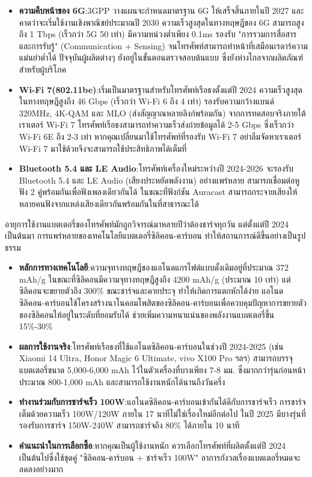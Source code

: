 \begin{itemize}
  \item \textbf{ความคืบหน้าของ 6G}:3GPP วางแผนจะกำหนดมาตรฐาน 6G ให้เสร็จสิ้นภายในปี 2027 และคาดว่าจะเริ่มใช้งานเชิงพาณิชย์ประมาณปี 2030 ความเร็วสูงสุดในทางทฤษฎีของ 6G สามารถสูงถึง 1 Tbps (เร็วกว่า 5G 50 เท่า) มีความหน่วงต่ำเพียง 0.1ms รองรับ "การรวมการสื่อสารและการรับรู้" (Communication + Sensing) จนโทรศัพท์สามารถทำหน้าที่เสมือนเรดาร์ความแม่นยำต่ำได้ ปัจจุบันผู้ผลิตต่างๆ ยังอยู่ในขั้นตอนตรวจสอบต้นแบบ ซึ่งยังห่างไกลจากผลิตภัณฑ์สำหรับผู้บริโภค
  \item \textbf{Wi-Fi 7(802.11be)}:เริ่มเป็นมาตรฐานสำหรับโทรศัพท์เรือธงตั้งแต่ปี 2024 ความเร็วสูงสุดในทางทฤษฎีสูงถึง 46 Gbps (เร็วกว่า Wi-Fi 6 ถึง 4 เท่า) รองรับความกว้างแบนด์ 320MHz, 4K-QAM และ MLO (ส่งสัญญาณหลายลิงก์พร้อมกัน) จากการทดสอบจริงภายใต้เราเตอร์ Wi-Fi 7 โทรศัพท์เรือธงสามารถทำความเร็วส่งถ่ายข้อมูลได้ 2-5 Gbps ซึ่งเร็วกว่า Wi-Fi 6E ถึง 2-3 เท่า หากคุณเปลี่ยนมาใช้โทรศัพท์ที่รองรับ Wi-Fi 7 อย่าลืมจัดหาเราเตอร์ Wi-Fi 7 มาใช้ด้วยจึงจะสามารถใช้ประสิทธิภาพได้เต็มที่
  \item \textbf{Bluetooth 5.4 และ LE Audio}:โทรศัพท์เครื่องใหม่ระหว่างปี 2024-2026 จะรองรับ Bluetooth 5.4 และ LE Audio (เสียงประหยัดพลังงาน) อย่างแพร่หลาย สามารถเชื่อมต่อหูฟัง 2 คู่พร้อมกันเพื่อฟังเพลงเดียวกันได้ ในขณะที่ฟังก์ชัน Auracast สามารถกระจายเสียงให้หลายคนฟังจากแหล่งเสียงเดียวกันพร้อมกันในที่สาธารณะได้
\end{itemize}


อายุการใช้งานแบตเตอรี่ของโทรศัพท์มักถูกวิจารณ์มาหลายปีว่าต้องชาร์จทุกวัน แต่ตั้งแต่ปี 2024 เป็นต้นมา การแพร่หลายของเทคโนโลยีแบตเตอรี่ซิลิคอน-คาร์บอน ทำให้สถานการณ์ดีขึ้นอย่างเป็นรูปธรรม

\begin{itemize}
  \item \textbf{หลักการทางเทคโนโลยี}:ความจุทางทฤษฎีของแอโนดแกรไฟต์แบบดั้งเดิมอยู่ที่ประมาณ 372 mAh/g ในขณะที่ซิลิคอนมีความจุทางทฤษฎีสูงถึง 4200 mAh/g (ประมาณ 10 เท่า) แต่ซิลิคอนจะขยายตัวถึง 300\% ขณะชาร์จและคายประจุ ทำให้เกิดการแตกหักได้ง่าย แอโนดซิลิคอน-คาร์บอนใช้โครงสร้างนาโนคอมโพสิตของซิลิคอน-คาร์บอนเพื่อควบคุมปัญหาการขยายตัวของซิลิคอนให้อยู่ในระดับที่ยอมรับได้ ช่วยเพิ่มความหนาแน่นของพลังงานแบตเตอรี่ขึ้น 15\%-30\%
  \item \textbf{ผลการใช้งานจริง}:โทรศัพท์เรือธงที่ใช้แอโนดซิลิคอน-คาร์บอนในช่วงปี 2024-2025 (เช่น Xiaomi 14 Ultra, Honor Magic 6 Ultimate, vivo X100 Pro ฯลฯ) สามารถบรรจุแบตเตอรี่ขนาด 5,000-6,000 mAh ไว้ในตัวเครื่องที่บางเพียง 7-8 มม. ซึ่งมากกว่ารุ่นก่อนหน้าประมาณ 800-1,000 mAh และสามารถใช้งานหนักได้นานถึงวันครึ่ง
  \item \textbf{ทำงานร่วมกับการชาร์จเร็ว 100W}:แอโนดซิลิคอน-คาร์บอนเข้ากันได้ดีกับการชาร์จเร็ว การชาร์จเต็มด้วยความเร็ว 100W/120W ภายใน 17 นาทีไม่ใช่เรื่องใหม่อีกต่อไป ในปี 2025 มีบางรุ่นที่รองรับการชาร์จ 150W-240W สามารถชาร์จถึง 80\% ได้ภายใน 10 นาที
  \item \textbf{คำแนะนำในการเลือกซื้อ}:หากคุณเป็นผู้ใช้งานหนัก ควรเลือกโทรศัพท์ที่ผลิตตั้งแต่ปี 2024 เป็นต้นไปซึ่งใช้ชุดคู่ "ซิลิคอน-คาร์บอน + ชาร์จเร็ว 100W" อาการกังวลเรื่องแบตเตอรี่หมดจะลดลงอย่างมาก
\end{itemize}

